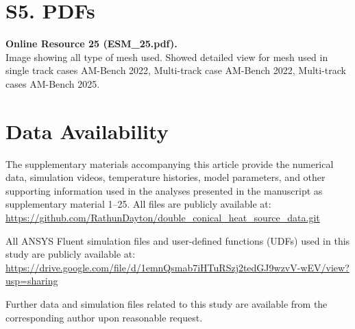\documentclass[11pt]{article}
\begin{document}
\section*{S5. PDFs}

\textbf{Online Resource 25 (ESM\_25.pdf).}\\
Image showing all type of mesh used. Showed detailed view for mesh used in single 
track cases AM-Bench 2022, Multi-track case AM-Bench 2022, Multi-track cases AM-Bench 2025.



\section*{Data Availability}

The supplementary materials accompanying this article provide the numerical
data, simulation videos, temperature histories, model parameters, and other
supporting information used in the analyses presented in the manuscript as supplementary material 1--25. All files are publicly available at:
\newline
\url{https://github.com/RathunDayton/double_conical_heat_source_data.git}

All ANSYS Fluent simulation files and user-defined functions (UDFs) used in this study are publicly available at:
\newline
\url{https://drive.google.com/file/d/1emnQsmab7iHTuRSzj2tedGJ9wzvV-wEV/view?usp=sharing}

 Further data and simulation files related to this study are available
from the corresponding author upon reasonable request.
\end{document}
